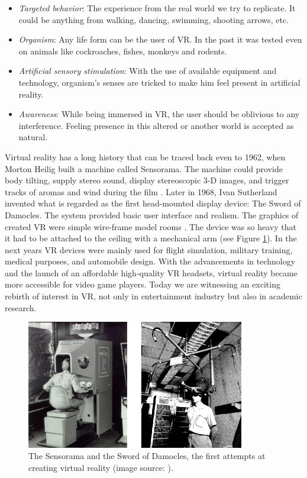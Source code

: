 \begin{itemize}
\item \textit{Targeted behavior}: The experience from the real world we try to replicate. It could be anything from walking, dancing, swimming, shooting arrows, etc.
\item \textit{Organism}: Any life form can be the user of VR. In the past it was tested even on animals like cockroaches, fishes, monkeys and rodents.
\item \textit{Artificial sensory stimulation}: With the use of available equipment and technology, organism’s senses are tricked to make him feel present in artificial reality.
\item \textit{Awareness}: While being immersed in VR, the user should be oblivious to any interference. Feeling presence in this altered or another world is accepted as natural.
\end{itemize}

Virtual reality has a long history that can be traced back even to 1962, when Morton Heilig built a machine called Sensorama. The machine could provide body tilting, supply stereo sound, display stereoscopic 3-D images, and trigger tracks of aromas and wind during the film \cite{SENSORAMA}. Later in 1968, Ivan Sutherland invented what is regarded as the first head-mounted display device: The Sword of Damocles. The system provided basic user interface and realism. The graphics of created VR were simple wire-frame model rooms \cite{DAMOCLES}. The device was so heavy that it had to be attached to the ceiling with a mechanical arm (see Figure \ref{fig:FIRST_VR}). In the next years VR devices were mainly used for flight simulation, military training, medical purposes, and automobile design. With the advancements in technology and the launch of an affordable high-quality VR headsets, virtual reality became more accessible for video game players. Today we are witnessing an exciting rebirth of interest in VR, not only in entertainment industry but also in academic research.

\begin{figure}[th]
\centering
\includegraphics[width=0.85\textwidth]{img/first_vr.png}
\caption{The Sensorama and the Sword of Damocles, the first attempts at creating virtual reality (image source: \cite{SENSORAMA_IMAGE}\cite{DAMOCLES}).}
\label{fig:FIRST_VR}
\end{figure}

